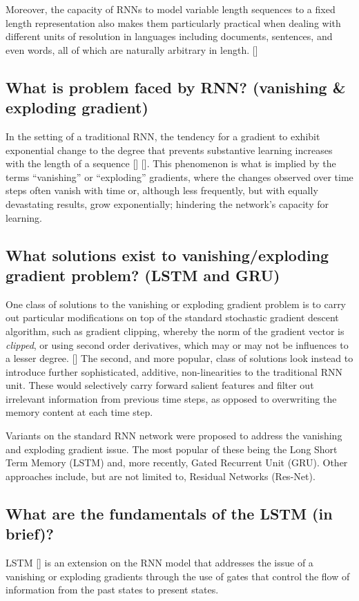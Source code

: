\documentclass[12pt, a4paper]{report}
\theoremstyle{definition}
\theoremstyle{definition}%
\theoremstyle{definition}%
\theoremstyle{definition}%
\theoremstyle{definition}%
\theoremstyle{definition}%
\renewcommand{\cite}[1]{[\citealp{#1}]}
\begin{document}
Moreover, the capacity of RNNs to model variable length sequences to a fixed length representation also makes them particularly practical when dealing with different units of resolution in languages including documents, sentences, and even words, all of which are naturally arbitrary in length. \cite{tang}

\subsection{What is problem faced by RNN? (vanishing \& exploding gradient)}
In the setting of a traditional RNN, the tendency for a gradient to exhibit exponential change to the degree that prevents substantive learning increases with the length of a sequence \cite{bengio1994} \cite{hochreiter1997}. This phenomenon is what is implied by the terms \enquote{vanishing} or \enquote{exploding} gradients, where the changes observed over time steps often vanish with time or, although less frequently, but with equally devastating results, grow exponentially; hindering the network's capacity for learning.

\subsection{What solutions exist to  vanishing/exploding gradient problem? (LSTM and GRU)}
One class of solutions to the vanishing or exploding gradient problem is to carry out particular modifications on top of the standard stochastic gradient descent algorithm, such as gradient clipping, whereby the norm of the gradient vector is \textit{clipped}, or using second order derivatives, which may or may not be influences to a lesser degree. \cite{chung2014}
The second, and more popular, class of solutions look instead to introduce further sophisticated, additive, non-linearities to the traditional RNN unit. These would selectively carry forward salient features and filter out irrelevant information from previous time steps, as opposed to overwriting the memory content at each time step.

Variants on the standard RNN network were proposed to address the vanishing and exploding gradient issue. The most popular of these being the Long Short Term Memory (LSTM) and, more recently, Gated Recurrent Unit (GRU). Other approaches include, but are not limited to, Residual Networks (Res-Net).

\subsection{What are the fundamentals of the LSTM (in brief)?}
LSTM \cite{hochreiter1997} is an extension on the RNN model that addresses the issue of a vanishing or exploding gradients through the use of gates that control the flow of information from the past states to present states.
\end{document}
